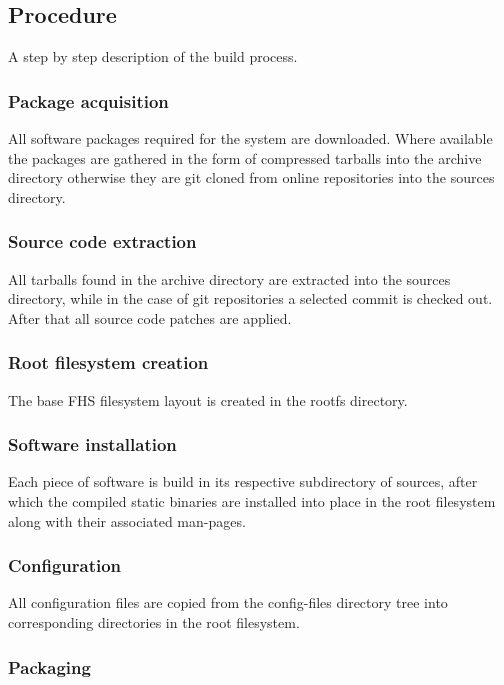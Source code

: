\subsection{Procedure}

A step by step description of the build process.

\subsubsection{Package acquisition}

All software packages required for the system are downloaded. Where available the packages are gathered in the form of compressed tarballs into the archive directory otherwise they are git cloned from online repositories into the sources directory.

\subsubsection{Source code extraction}

All tarballs found in the archive directory are extracted into the sources directory, while in the case of git repositories a selected commit is checked out. After that all source code patches are applied.

\subsubsection{Root filesystem creation}

The base FHS filesystem layout is created in the rootfs directory.

\subsubsection{Software installation}

Each piece of software is build in its respective subdirectory of sources, after which the compiled static binaries are installed into place in the root filesystem along with their associated man-pages.

\subsubsection{Configuration}

All configuration files are copied from the config-files directory tree into corresponding directories in the root filesystem.

\subsubsection{Packaging}


